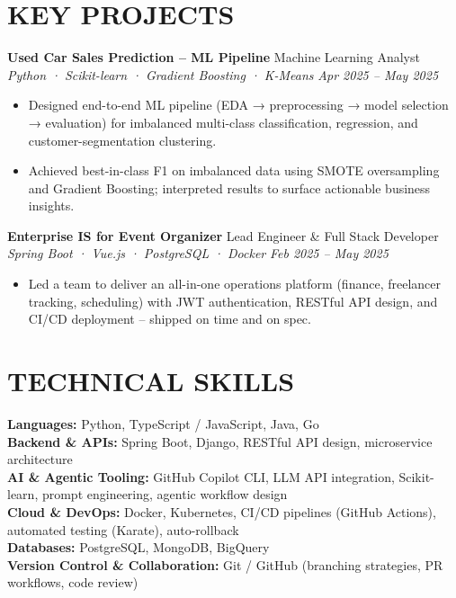\documentclass[10pt,a4paper]{article}
\newcommand{\experienceheader}[4]{
    \textbf{#1} \hfill #2 \\
    \textit{#3} \hfill \textit{#4}
}
\begin{document}
\vspace{-4pt}

\section*{KEY PROJECTS}

\experienceheader{Used Car Sales Prediction -- ML Pipeline}{Machine Learning Analyst}{Python · Scikit-learn · Gradient Boosting · K-Means}{Apr 2025 -- May 2025}
\begin{itemize}[leftmargin=*, itemsep=1pt, topsep=1pt]
    \item Designed end-to-end ML pipeline (EDA → preprocessing → model selection → evaluation) for imbalanced multi-class classification, regression, and customer-segmentation clustering.
    \item Achieved best-in-class F1 on imbalanced data using SMOTE oversampling and Gradient Boosting; interpreted results to surface actionable business insights.
\end{itemize}

\vspace{2pt}

\experienceheader{Enterprise IS for Event Organizer}{Lead Engineer \& Full Stack Developer}{Spring Boot · Vue.js · PostgreSQL · Docker}{Feb 2025 -- May 2025}
\begin{itemize}[leftmargin=*, itemsep=1pt, topsep=1pt]
    \item Led a team to deliver an all-in-one operations platform (finance, freelancer tracking, scheduling) with JWT authentication, RESTful API design, and CI/CD deployment -- shipped on time and on spec.
\end{itemize}

\vspace{-4pt}

\section*{TECHNICAL SKILLS}

\textbf{Languages:} Python, TypeScript / JavaScript, Java, Go \\
\textbf{Backend \& APIs:} Spring Boot, Django, RESTful API design, microservice architecture \\
\textbf{AI \& Agentic Tooling:} GitHub Copilot CLI, LLM API integration, Scikit-learn, prompt engineering, agentic workflow design \\
\textbf{Cloud \& DevOps:} Docker, Kubernetes, CI/CD pipelines (GitHub Actions), automated testing (Karate), auto-rollback \\
\textbf{Databases:} PostgreSQL, MongoDB, BigQuery \\
\textbf{Version Control \& Collaboration:} Git / GitHub (branching strategies, PR workflows, code review)
\end{document}
